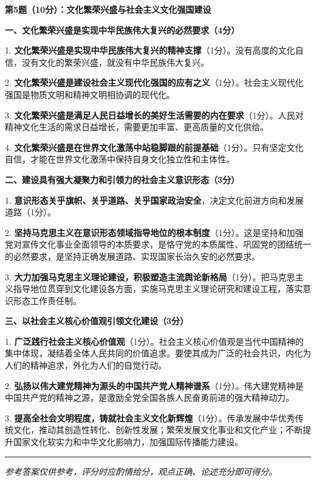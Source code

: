 \documentclass[12pt, a4paper]{article}
\newcommand{\examrule}{\noindent\rule{\linewidth}{0.6pt}}
\begin{document}
\begin{answerbox}

\textbf{第5题（10分）：文化繁荣兴盛与社会主义文化强国建设}

\textbf{一、文化繁荣兴盛是实现中华民族伟大复兴的必然要求（4分）}

1. \textbf{文化繁荣兴盛是实现中华民族伟大复兴的精神支撑}（1分）。没有高度的文化自信，没有文化的繁荣兴盛，就没有中华民族伟大复兴。

2. \textbf{文化繁荣兴盛是建设社会主义现代化强国的应有之义}（1分）。社会主义现代化强国是物质文明和精神文明相协调的现代化。

3. \textbf{文化繁荣兴盛是满足人民日益增长的美好生活需要的内在要求}（1分）。人民对精神文化生活的需求日益增长，需要更加丰富、更高质量的文化供给。

4. \textbf{文化繁荣兴盛是在世界文化激荡中站稳脚跟的前提基础}（1分）。只有坚定文化自信，才能在世界文化激荡中保持自身文化独立性和主体性。

\textbf{二、建设具有强大凝聚力和引领力的社会主义意识形态（3分）}

1. \textbf{意识形态关乎旗帜、关乎道路、关乎国家政治安全}，决定文化前进方向和发展道路（1分）。

2. \textbf{坚持马克思主义在意识形态领域指导地位的根本制度}（1分）。这是坚持和加强党对宣传文化事业全面领导的本质要求，是恪守党的本质属性、巩固党的团结统一的必然要求，是坚持正确发展道路、实现国家长治久安的必然要求。

3. \textbf{大力加强马克思主义理论建设，积极塑造主流舆论新格局}（1分）。把马克思主义指导地位贯穿到文化建设各方面，实施马克思主义理论研究和建设工程，落实意识形态工作责任制。

\textbf{三、以社会主义核心价值观引领文化建设（3分）}

1. \textbf{广泛践行社会主义核心价值观}（1分）。社会主义核心价值观是当代中国精神的集中体现，凝结着全体人民共同的价值追求。要使其成为广泛的社会共识，内化为人们的精神追求，外化为人们的自觉行动。

2. \textbf{弘扬以伟大建党精神为源头的中国共产党人精神谱系}（1分）。伟大建党精神是中国共产党的精神之源，是激励全党全国各族人民奋勇前进的强大精神动力。

3. \textbf{提高全社会文明程度，铸就社会主义文化新辉煌}（1分）。传承发展中华优秀传统文化，推动其创造性转化、创新性发展；繁荣发展文化事业和文化产业；不断提升国家文化软实力和中华文化影响力，加强国际传播能力建设。

\end{answerbox}

\vspace{12pt}
\examrule
\begin{center}
  \textit{参考答案仅供参考，评分时应酌情给分，观点正确、论述充分即可得分。}
\end{center}
\end{document}
